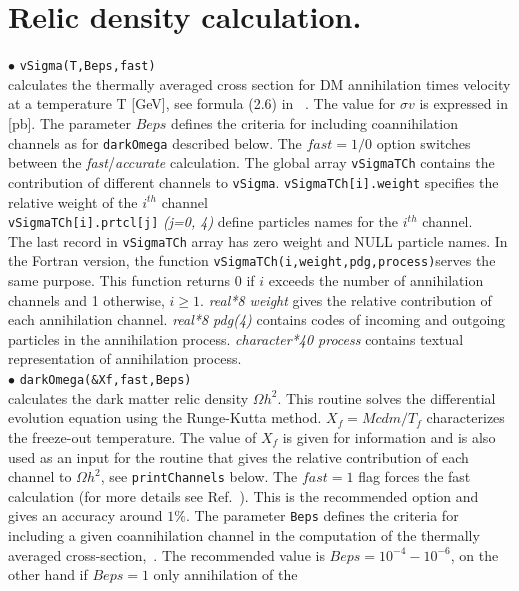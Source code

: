 \documentclass[12pt,a4paper]{article}
\begin{document}
\section{ Relic density calculation.}

$\bullet$ \verb|vSigma(T,Beps,fast)|\\
calculates the thermally averaged cross section for DM annihilation  times velocity  
at a  temperature T [GeV], see formula (2.6) in ~\cite{Belanger:2001fz}. The value for $\sigma v$ 
is expressed in [pb].  The parameter $Beps$ defines the criteria for including coannihilation
channels as for {\tt darkOmega} described below.
The $fast=1/0$ option switches between the {\it fast}/{\it accurate} calculation. 
The global array {\tt vSigmaTCh} contains the 
contribution of different channels to {\tt vSigma}. \verb|vSigmaTCh[i].weight| specifies the relative
weight of the $i^{th}$ channel \\
\verb|vSigmaTCh[i].prtcl[j]|  {\it (j=0, 4)}  define particles names for the $i^{th}$
channel.\\
The last record in \verb|vSigmaTCh| array has zero weight and 
NULL particle names.  In the Fortran version, the function 
 \verb|vSigmaTCh(i,weight,pdg,process)|serves the same purpose.  This function returns 0
if $i$  exceeds the number of annihilation  channels and 1 otherwise, $i\ge 1$. 
 {\it real*8 weight} gives the relative contribution of each
annihilation channel. {\it real*8 pdg(4)} contains codes of incoming and
outgoing particles in the  annihilation process. {\it character*40  process}
contains textual  representation of annihilation process.\\ 
\noindent 
$\bullet$ \verb|darkOmega(&Xf,fast,Beps)|\\
calculates the dark matter relic density $\Omega h^2$. 
This routine  solves the differential evolution equation  using the Runge-Kutta method. 
$X_f=Mcdm/T_{f}$
characterizes the freeze-out temperature.   The value of $X_f$ is given for
information and is also used as an input for the routine that
gives the relative contribution of each channel to $\Omega h^2$,
see \verb|printChannels|  below. The  $fast=1$ flag forces the
fast calculation (for more details see
Ref.~\cite{Belanger:2004yn}). This is the recommended option and
gives an accuracy around $1\%$. The parameter {\tt Beps} defines the
criteria for including a given coannihilation channel in the computation of the
thermally averaged cross-section,~\cite{Belanger:2004yn}.   The
recommended value is $Beps=10^{-4} - 10^{-6}$, on the other hand
if $Beps=1$ only annihilation of the
\end{document}
